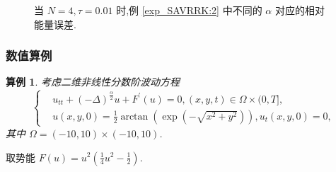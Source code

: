 \documentclass[aspectratio=169]{beamer}
\newtheorem{myexample}{算例}[section] %
\numberwithin{theorem}{section} %
\numberwithin{equation}{section}%
\numberwithin{figure}{section}%
\numberwithin{table}{section}%
\begin{document}
\begin{frame}%
	\begin{figure}[H]
		\begin{center}
		\caption{当 $N=4, \tau=0.01$ 时,例 \ref{exp_SAVRRK:2} 中不同的 $\alpha$ 对应的相对能量误差.}
		\label{fig_SAVRRK:2-4}
		\end{center}
		\end{figure}
\end{frame}
\begin{frame}\frametitle{数值算例}
	\begin{myexample}\label{exp_SAVRRK:3}
		考虑二维非线性分数阶波动方程\cite{wangUnconditionalEnergyDissipation2021} 
		\begin{equation}
		\begin{cases}
		& u_{t t}+(-\Delta)^{\frac{\alpha}{2}} u+F^{\prime}(u)=0,(x, y, t) \in \Omega \times(0, T],\\
		& u(x, y, 0)=\frac{1}{2} \arctan \left(\exp \left(-\sqrt{x^2+y^2}\right)\right), u_t(x, y, 0)=0,
		\end{cases}
		\end{equation}
		其中 $\Omega=(-10,10) \times(-10,10)$.
		\end{myexample}
		
		取势能 $F(u)=u^2\left(\frac{1}{4} u^2-\frac{1}{2}\right)$.
\end{frame}
\end{document}
